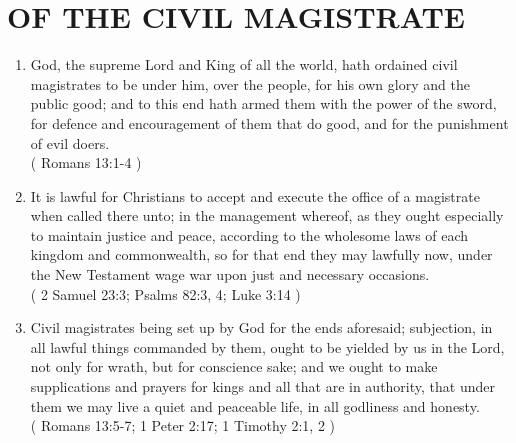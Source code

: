 \documentclass[12pt,a4paper]{book}
\begin{document}
\chapter{OF THE CIVIL MAGISTRATE}
\label{ch-civ-maj}
\begin{enumerate}
\item
\label{ch-civ-maj-1}
God, the supreme Lord and King of all the world, hath ordained civil magistrates to be under him, over the people, for his own glory and the public good; and to this end hath armed them with the power of the sword, for defence and encouragement of them that do good, and for the punishment of evil doers.\\
( Romans 13:1-4 )
\item
\label{ch-civ-maj-2}
It is lawful for Christians to accept and execute the office of a magistrate when called there unto; in the management whereof, as they ought especially to maintain justice and peace, according to the wholesome laws of each kingdom and commonwealth, so for that end they may lawfully now, under the New Testament wage war upon just and necessary occasions.\\
( 2 Samuel 23:3; Psalms 82:3, 4; Luke 3:14 )
\item
\label{ch-civ-maj-3}
Civil magistrates being set up by God for the ends aforesaid; subjection, in all lawful things commanded by them, ought to be yielded by us in the Lord, not only for wrath, but for conscience sake; and we ought to make supplications and prayers for kings and all that are in authority, that under them we may live a quiet and peaceable life, in all godliness and honesty.\\
( Romans 13:5-7; 1 Peter 2:17; 1 Timothy 2:1, 2 )
\end{enumerate}
\end{document}
